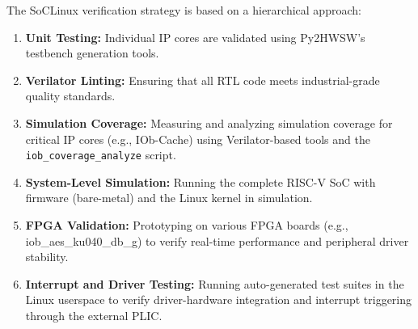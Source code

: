 %

The SoCLinux verification strategy is based on a hierarchical approach:

\begin{enumerate}
    \item \textbf{Unit Testing:} Individual IP cores are validated using Py2HWSW's testbench generation tools.
    \item \textbf{Verilator Linting:} Ensuring that all RTL code meets industrial-grade quality standards.
    \item \textbf{Simulation Coverage:} Measuring and analyzing simulation coverage for critical IP cores (e.g., IOb-Cache) using Verilator-based tools and the \texttt{iob\_coverage\_analyze} script.
    \item \textbf{System-Level Simulation:} Running the complete RISC-V SoC with firmware (bare-metal) and the Linux kernel in simulation.
    \item \textbf{FPGA Validation:} Prototyping on various FPGA boards (e.g., iob\_aes\_ku040\_db\_g) to verify real-time performance and peripheral driver stability.
    \item \textbf{Interrupt and Driver Testing:} Running auto-generated test suites in the Linux userspace to verify driver-hardware integration and interrupt triggering through the external PLIC.
\end{enumerate}
